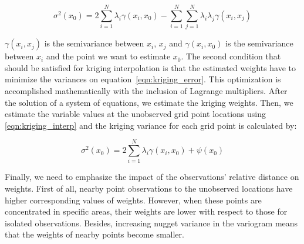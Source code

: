\begin{equation}
\sigma^{2}(x_{0}) = 2 \sum^{N}_{i=1} \lambda_{i} \gamma(x_{i},x_{0}) - \sum^{N}_{i=1} \sum^{N}_{j=1} \lambda_{i} \lambda_{j} \gamma(x_{i},x_{j})
\label{eqn:kriging_error}
\end{equation}

$\gamma(x_{i},x_{j})$ is the semivariance between $x_{i}$, $x_{j}$ and $\gamma(x_{i},x_{0})$ is the semivariance between $x_{i}$ and the point we want to estimate $x_{0}$. The second condition that should be satisfied for kriging interpolation is that the estimated weights have to minimize the variances on equation~\ref{eqn:kriging_error}. This optimization is accomplished mathematically with the inclusion of Lagrange multipliers. After the solution of a system of equations, we estimate the kriging weights. Then, we estimate the variable values at the unobserved grid point locations using \ref{eqn:kriging_interp} and the kriging variance for each grid point is calculated by:


\begin{equation}
\sigma^{2}(x_{0}) = 2 \sum^{N}_{i=1} \lambda_{i} \gamma(x_{i},x_{0}) + \psi(x_{0})
\label{eqn:kriging_variance}
\end{equation}


Finally, we need to emphasize the impact of the observations' relative distance on weights. First of all, nearby point observations to the unobserved locations have higher corresponding values of weights. However, when these points are concentrated in specific areas, their weights are lower with respect to those for isolated observations. Besides, increasing nugget variance in the variogram means that the weights of nearby points become smaller.



